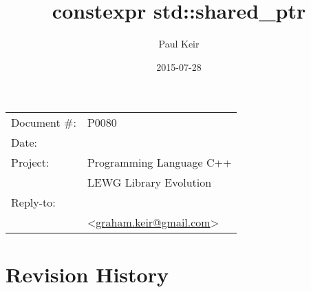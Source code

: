 \documentclass[11pt]{article}
\date{}
\title{constexpr std::shared_ptr}
\makeatletter
\newcommand{\emailaddress}{graham.keir@gmail.com}
\newcommand{\email}{\href{mailto:\emailaddress}{\emailaddress}}
\makeatother
\begin{document}
\maketitle\vspace{-2cm}

\begin{flushright}
  \begin{tabular}{ll}
  Document \#:&P0080\\
  Date:       &\date{2015-07-28}\\
  Project:    &Programming Language C++\\
              &LEWG Library Evolution\\
  Reply-to:   &\author{Paul Keir}\\
              &\textless\email\textgreater
  \end{tabular}
\end{flushright}

{\hypersetup{linkcolor=black}
  \tableofcontents
}

\section{Revision History}
\end{document}
